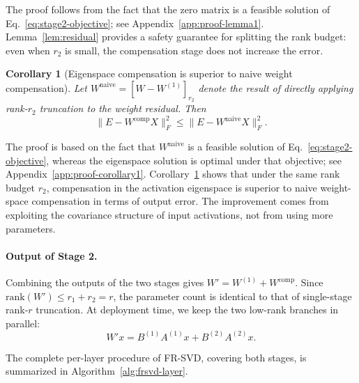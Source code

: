 \documentclass[a4paper,fleqn]{cas-dc}
\newtheorem{corollary}[theorem]{Corollary}
\begin{document}
The proof follows from the fact that the zero matrix is a feasible solution of Eq.~\eqref{eq:stage2-objective}; see Appendix~\ref{app:proof-lemma1}. Lemma~\ref{lem:residual} provides a safety guarantee for splitting the rank budget: even when $r_2$ is small, the compensation stage does not increase the error.

\setcounter{theorem}{0}
\begin{corollary}[Eigenspace compensation is superior to naive weight compensation]\label{cor:eigenspace}
Let $W^{\mathrm{naive}} = [W - W^{(1)}]_{r_2}$ denote the result of directly applying rank-$r_2$ truncation to the weight residual. Then
\begin{equation}
\|E - W^{\mathrm{comp}}X\|_F^2 \le \|E - W^{\mathrm{naive}}X\|_F^2.
\label{eq:corollary-eigenspace}
\end{equation}
\end{corollary}

The proof is based on the fact that $W^{\mathrm{naive}}$ is a feasible solution of Eq.~\eqref{eq:stage2-objective}, whereas the eigenspace solution is optimal under that objective; see Appendix~\ref{app:proof-corollary1}. Corollary~\ref{cor:eigenspace} shows that under the same rank budget $r_2$, compensation in the activation eigenspace is superior to naive weight-space compensation in terms of output error. The improvement comes from exploiting the covariance structure of input activations, not from using more parameters.

\paragraph{Output of Stage 2.}
Combining the outputs of the two stages gives $W' = W^{(1)} + W^{\mathrm{comp}}$.
Since $\mathrm{rank}(W') \le r_1 + r_2 = r$, the parameter count is identical to that of single-stage rank-$r$ truncation. At deployment time, we keep the two low-rank branches in parallel:
\begin{equation}
W'x = B^{(1)}A^{(1)}x + B^{(2)}A^{(2)}x.
\end{equation}

The complete per-layer procedure of FR-SVD, covering both stages, is summarized in Algorithm~\ref{alg:frsvd-layer}.
\end{document}
